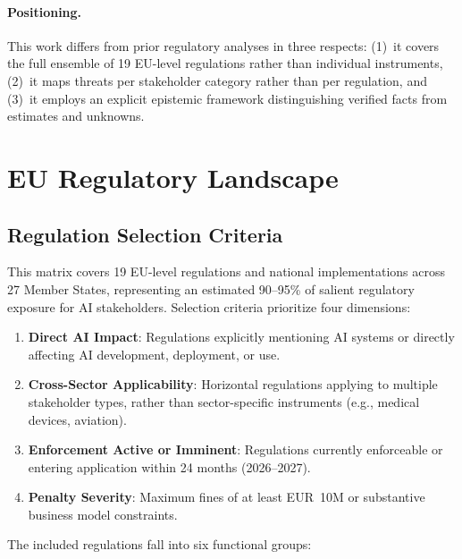 \documentclass[11pt,a4paper]{article}
\begin{document}
\paragraph{Positioning.} This work differs from prior regulatory analyses in three respects: (1)~it covers the full ensemble of 19 EU-level regulations rather than individual instruments, (2)~it maps threats per stakeholder category rather than per regulation, and (3)~it employs an explicit epistemic framework distinguishing verified facts from estimates and unknowns.


\section{EU Regulatory Landscape}
\label{sec:landscape}

\subsection{Regulation Selection Criteria}

This matrix covers 19 EU-level regulations and national implementations across 27 Member States, representing an estimated 90--95\% of salient regulatory exposure for AI stakeholders. Selection criteria prioritize four dimensions:

\begin{enumerate}
  \item \textbf{Direct AI Impact}: Regulations explicitly mentioning AI systems or directly affecting AI development, deployment, or use.
  \item \textbf{Cross-Sector Applicability}: Horizontal regulations applying to multiple stakeholder types, rather than sector-specific instruments (e.g., medical devices, aviation).
  \item \textbf{Enforcement Active or Imminent}: Regulations currently enforceable or entering application within 24 months (2026--2027).
  \item \textbf{Penalty Severity}: Maximum fines of at least EUR~10M or substantive business model constraints.
\end{enumerate}

The included regulations fall into six functional groups:
\end{document}

